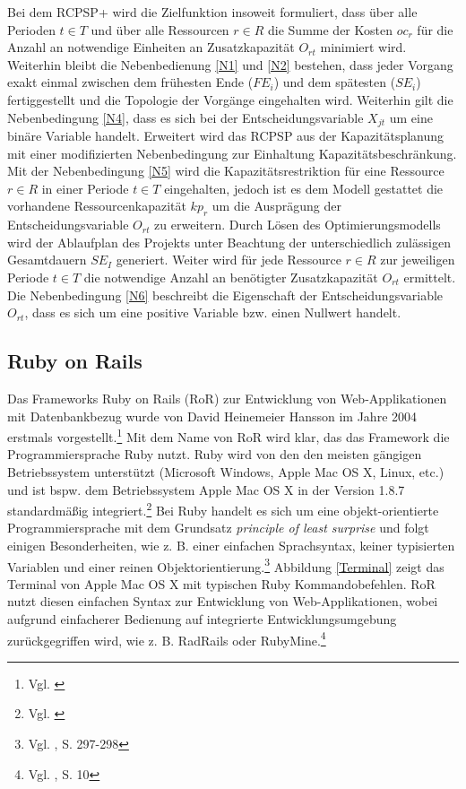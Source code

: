 \documentclass[a4paper,12pt,parskip,bibtotoc,liststotoc]{article}
\begin{document}
Bei dem RCPSP+ wird die Zielfunktion insoweit formuliert, dass über alle Perioden $t\in T$ und über alle Ressourcen $r\in R$ die Summe der Kosten $oc_r$ für die Anzahl an notwendige Einheiten an Zusatzkapazität $O_{rt}$ minimiert wird. Weiterhin bleibt die Nebenbedienung \eqref{N1} und \eqref{N2} bestehen, dass jeder Vorgang exakt einmal zwischen dem frühesten Ende ($FE_i$) und dem spätesten ($SE_i$) fertiggestellt und die Topologie der Vorgänge eingehalten wird. Weiterhin gilt die Nebenbedingung \eqref{N4}, dass es sich bei der Entscheidungsvariable $X_{jt}$ um eine binäre Variable handelt. Erweitert wird das RCPSP aus der Kapazitätsplanung mit einer modifizierten Nebenbedingung zur Einhaltung Kapazitätsbeschränkung. Mit der Nebenbedingung \eqref{N5} wird die Kapazitätsrestriktion für eine Ressource $r\in R$ in einer Periode $t\in T$ eingehalten, jedoch ist es dem Modell gestattet die vorhandene Ressourcenkapazität $kp_r$ um die Ausprägung der Entscheidungsvariable $O_{rt}$ zu erweitern. Durch Lösen des Optimierungsmodells wird der Ablaufplan des Projekts unter Beachtung der unterschiedlich zulässigen Gesamtdauern $SE_I$ generiert. Weiter wird für jede Ressource $r\in R$ zur jeweiligen Periode $t\in T$ die notwendige Anzahl an benötigter Zusatzkapazität $O_{rt}$ ermittelt. Die Nebenbedingung \eqref{N6} beschreibt die Eigenschaft der Entscheidungsvariable $O_{rt}$, dass es sich um eine positive Variable bzw. einen Nullwert handelt.

\subsection{Ruby on Rails}

Das Frameworks Ruby on Rails (RoR) zur Entwicklung von Web-Applikationen mit Datenbankbezug wurde von David Heinemeier Hansson im Jahre 2004 erstmals vorgestellt.\footnote{Vgl. \cite{ruby2004}} Mit dem Name von RoR wird klar, das das Framework die Programmiersprache Ruby nutzt. Ruby wird von den den meisten gängigen Betriebssystem unterstützt (Microsoft Windows, Apple Mac OS X, Linux, etc.) und ist bspw. dem Betriebssystem Apple Mac OS X in der Version 1.8.7 standardmäßig integriert.\footnote{Vgl. \cite{ruby-schienen}} Bei Ruby handelt es sich um eine objekt-orientierte Programmiersprache mit dem Grundsatz \textit{principle of least surprise} und folgt einigen Besonderheiten, wie z. B. einer einfachen Sprachsyntax, keiner typisierten Variablen und einer reinen Objektorientierung.\footnote{Vgl. \cite{Walter:2008aa}, S. 297-298} Abbildung \ref{Terminal} zeigt das Terminal von Apple Mac OS X mit typischen Ruby Kommandobefehlen. RoR nutzt diesen einfachen Syntax zur Entwicklung von Web-Applikationen, wobei aufgrund einfacherer Bedienung auf integrierte Entwicklungsumgebung zurückgegriffen wird, wie z. B. RadRails oder RubyMine.\footnote{Vgl. \cite{hartl2012ruby}, S. 10} \\
\end{document}
